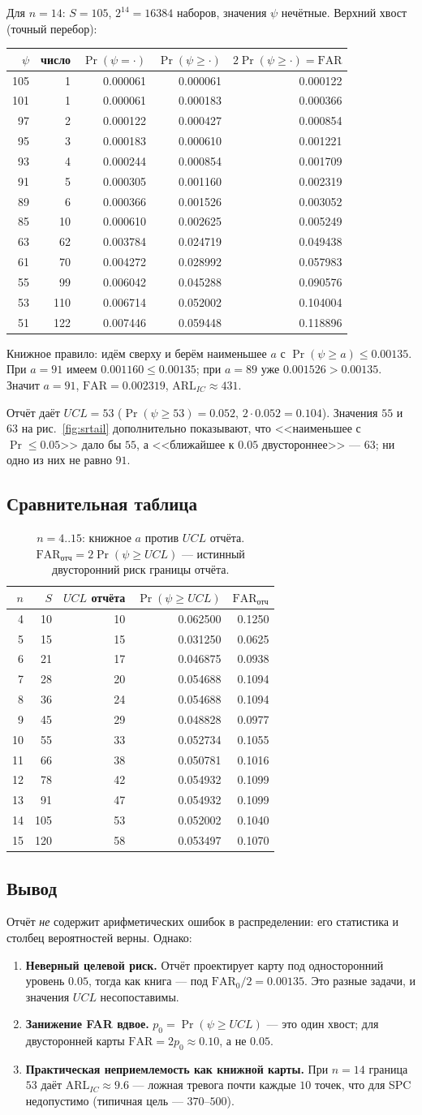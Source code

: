 \documentclass[11pt,a4paper]{article}
\newcommand{\FAR}{\mathrm{FAR}}
\newcommand{\ARL}{\mathrm{ARL}}
\newcommand{\FARz}{\FAR_0}
\def\srSrcTable{%
4 & 10 & 10 & 0.062500 & 0.1250\\
5 & 15 & 15 & 0.031250 & 0.0625\\
6 & 21 & 17 & 0.046875 & 0.0938\\
7 & 28 & 20 & 0.054688 & 0.1094\\
8 & 36 & 24 & 0.054688 & 0.1094\\
9 & 45 & 29 & 0.048828 & 0.0977\\
10 & 55 & 33 & 0.052734 & 0.1055\\
11 & 66 & 38 & 0.050781 & 0.1016\\
12 & 78 & 42 & 0.054932 & 0.1099\\
13 & 91 & 47 & 0.054932 & 0.1099\\
14 & 105 & 53 & 0.052002 & 0.1040\\
15 & 120 & 58 & 0.053497 & 0.1070\\}
\def\srNfourteenTable{%
105 & 1 & 0.000061 & 0.000061 & 0.000122\\
101 & 1 & 0.000061 & 0.000183 & 0.000366\\
97 & 2 & 0.000122 & 0.000427 & 0.000854\\
95 & 3 & 0.000183 & 0.000610 & 0.001221\\
93 & 4 & 0.000244 & 0.000854 & 0.001709\\
91 & 5 & 0.000305 & 0.001160 & 0.002319\\
89 & 6 & 0.000366 & 0.001526 & 0.003052\\
85 & 10 & 0.000610 & 0.002625 & 0.005249\\
63 & 62 & 0.003784 & 0.024719 & 0.049438\\
61 & 70 & 0.004272 & 0.028992 & 0.057983\\
55 & 99 & 0.006042 & 0.045288 & 0.090576\\
53 & 110 & 0.006714 & 0.052002 & 0.104004\\
51 & 122 & 0.007446 & 0.059448 & 0.118896\\}
\begin{document}
Для $n=14$: $S=105$, $2^{14}=16384$ наборов, значения $\psi$ нечётные.
Верхний хвост (точный перебор):

\begin{center}\small
\renewcommand{\arraystretch}{1.12}
\begin{tabular}{rrrrr}
\toprule
$\psi$ & число & $\Pr(\psi=\cdot)$ & $\Pr(\psi\ge\cdot)$ & $2\Pr(\psi\ge\cdot)=\FAR$\\
\midrule
\srNfourteenTable
\bottomrule
\end{tabular}
\end{center}

Книжное правило: идём сверху и берём наименьшее $a$ с
$\Pr(\psi\ge a)\le0.00135$. При $a=91$ имеем $0.001160\le0.00135$;
при $a=89$ уже $0.001526>0.00135$. Значит $a=91$,
$\FAR=0.002319$, $\ARL_{IC}\approx431$.

Отчёт даёт $UCL=53$ ($\Pr(\psi\ge53)=0.052$, $2\cdot0.052=0.104$).
Значения $55$ и $63$ на рис.~\eqref{fig:srtail} дополнительно
показывают, что <<наименьшее с $\Pr\le0.05$>> дало бы $55$, а
<<ближайшее к $0.05$ двустороннее>> --- $63$; ни одно из них не равно
$91$.

\subsection{Сравнительная таблица}

\begin{table}[htbp]\centering
\caption{$n=4..15$: книжное $a$ против $UCL$ отчёта.
$\FAR_{отч}=2\Pr(\psi\ge UCL)$ --- истинный двусторонний риск границы
отчёта.}
\label{tab:srsrc}
\begin{tabular}{rrrrr}
\toprule
$n$ & $S$ & $UCL$ отчёта & $\Pr(\psi\ge UCL)$ & $\FAR_{отч}$\\
\midrule
\srSrcTable
\bottomrule
\end{tabular}
\end{table}

\subsection{Вывод}

Отчёт \emph{не} содержит арифметических ошибок в распределении: его
статистика и столбец вероятностей верны. Однако:

\begin{enumerate}
\item \textbf{Неверный целевой риск.} Отчёт проектирует карту под
односторонний уровень $0.05$, тогда как книга --- под
$\FARz/2=0.00135$. Это разные задачи, и значения $UCL$ несопоставимы.
\item \textbf{Занижение FAR вдвое.} $p_0=\Pr(\psi\ge UCL)$ --- это один
хвост; для двусторонней карты $\FAR=2p_0\approx0.10$, а не $0.05$.
\item \textbf{Практическая неприемлемость как книжной карты.} При
$n=14$ граница $53$ даёт $\ARL_{IC}\approx9.6$ --- ложная тревога почти
каждые $10$ точек, что для SPC недопустимо (типичная цель ---
$370$--$500$).
\end{enumerate}
\end{document}
